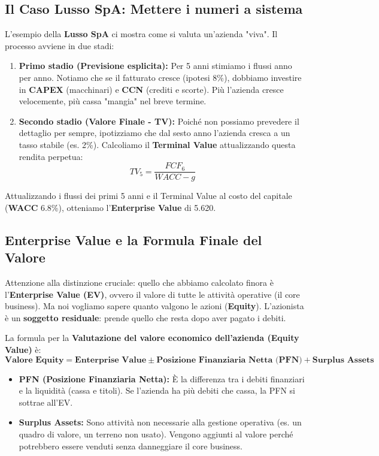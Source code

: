 \documentclass[a4paper,10pt]{article}
\begin{document}
\subsection*{Il Caso Lusso SpA: Mettere i numeri a sistema}

L'esempio della \textbf{Lusso SpA} ci mostra come si valuta un'azienda "viva". Il processo avviene in due stadi:
\begin{enumerate}
    \item \textbf{Primo stadio (Previsione esplicita):} Per 5 anni stimiamo i flussi anno per anno. Notiamo che se il fatturato cresce (ipotesi 8\%), dobbiamo investire in \textbf{CAPEX} (macchinari) e \textbf{CCN} (crediti e scorte). Più l'azienda cresce velocemente, più cassa "mangia" nel breve termine.
    \item \textbf{Secondo stadio (Valore Finale - TV):} Poiché non possiamo prevedere il dettaglio per sempre, ipotizziamo che dal sesto anno l'azienda cresca a un tasso stabile (es. 2\%). Calcoliamo il \textbf{Terminal Value} attualizzando questa rendita perpetua:
    \[ TV_5 = \frac{FCF_6}{WACC - g} \]
\end{enumerate}
Attualizzando i flussi dei primi 5 anni e il Terminal Value al costo del capitale (\textbf{WACC} 6.8\%), otteniamo l'\textbf{Enterprise Value} di 5.620.

\subsection*{Enterprise Value e la Formula Finale del Valore}

Attenzione alla distinzione cruciale: quello che abbiamo calcolato finora è l'\textbf{Enterprise Value (EV)}, ovvero il valore di tutte le attività operative (il core business). Ma noi vogliamo sapere quanto valgono le azioni (\textbf{Equity}).
L'azionista è un \textbf{soggetto residuale}: prende quello che resta dopo aver pagato i debiti.

La formula per la \textbf{Valutazione del valore economico dell'azienda (Equity Value)} è:
\[
\textbf{Valore Equity} = \textbf{Enterprise Value} \pm \textbf{Posizione Finanziaria Netta (PFN)} + \textbf{Surplus Assets}
\]

\begin{itemize}
    \item \textbf{PFN (Posizione Finanziaria Netta):} È la differenza tra i debiti finanziari e la liquidità (cassa e titoli). Se l'azienda ha più debiti che cassa, la PFN si sottrae all'EV.
    \item \textbf{Surplus Assets:} Sono attività non necessarie alla gestione operativa (es. un quadro di valore, un terreno non usato). Vengono aggiunti al valore perché potrebbero essere venduti senza danneggiare il core business.
\end{itemize}
\end{document}
